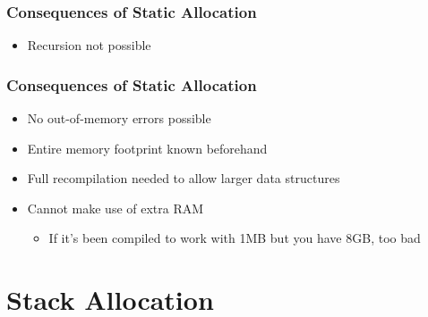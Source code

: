 \documentclass{../ucll-slides}
\begin{document}
\begin{frame}
  \frametitle{Consequences of Static Allocation}
  \notrealcpp
  \begin{itemize}
    \item Recursion not possible
  \end{itemize}
\end{frame}

\begin{frame}
  \frametitle{Consequences of Static Allocation}
  \begin{itemize}
    \item No out-of-memory errors possible
    \item Entire memory footprint known beforehand
    \item Full recompilation needed to allow larger data structures
    \item Cannot make use of extra RAM
      \begin{itemize}
        \item If it's been compiled to work with 1MB but you have 8GB, too bad
      \end{itemize}
  \end{itemize}
\end{frame}

\section{Stack Allocation}

\begin{frame}
  \tableofcontents[currentsection]
\end{frame}
\end{document}
